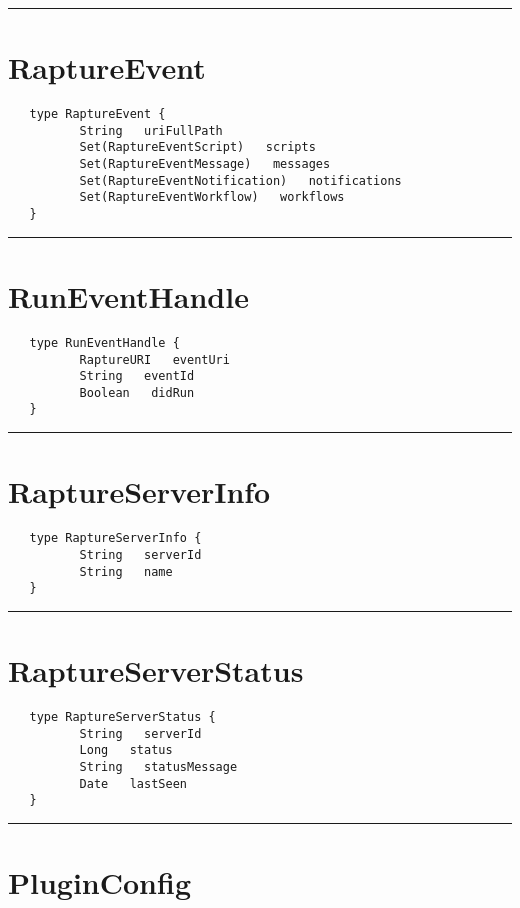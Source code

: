 \rule{12cm}{2pt}
\section{RaptureEvent}
\label{type:RaptureEvent}

\begin{verbatim}
   type RaptureEvent {
          String   uriFullPath
          Set(RaptureEventScript)   scripts
          Set(RaptureEventMessage)   messages
          Set(RaptureEventNotification)   notifications
          Set(RaptureEventWorkflow)   workflows
   }
\end{verbatim}

\rule{12cm}{2pt}
\section{RunEventHandle}
\label{type:RunEventHandle}

\begin{verbatim}
   type RunEventHandle {
          RaptureURI   eventUri
          String   eventId
          Boolean   didRun
   }
\end{verbatim}

\rule{12cm}{2pt}
\section{RaptureServerInfo}
\label{type:RaptureServerInfo}

\begin{verbatim}
   type RaptureServerInfo {
          String   serverId
          String   name
   }
\end{verbatim}

\rule{12cm}{2pt}
\section{RaptureServerStatus}
\label{type:RaptureServerStatus}

\begin{verbatim}
   type RaptureServerStatus {
          String   serverId
          Long   status
          String   statusMessage
          Date   lastSeen
   }
\end{verbatim}

\rule{12cm}{2pt}
\section{PluginConfig}
\label{type:PluginConfig}

